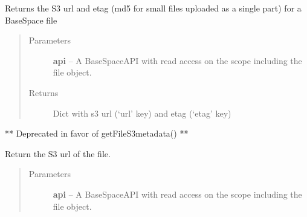 \documentclass[letterpaper,10pt,english]{sphinxmanual}
\begin{document}
\begin{fulllineitems}
\begin{fulllineitems}
\begin{quote}
\begin{description}
\end{description}\end{quote}

\end{fulllineitems}


\begin{fulllineitems}
\label{Available modules:BaseSpacePy.model.File.File.getFileS3metadata}
Returns the S3 url and etag (md5 for small files uploaded as a single part) for a BaseSpace file
\begin{quote}\begin{description}
\item[{Parameters}] \leavevmode
\textbf{api} -- A BaseSpaceAPI with read access on the scope including the file object.

\item[{Returns}] \leavevmode
Dict with s3 url (`url' key) and etag (`etag' key)

\end{description}\end{quote}

\end{fulllineitems}


\begin{fulllineitems}
\label{Available modules:BaseSpacePy.model.File.File.getFileUrl}
** Deprecated in favor of getFileS3metadata() **

Return the S3 url of the file.
\begin{quote}\begin{description}
\item[{Parameters}] \leavevmode
\textbf{api} -- A BaseSpaceAPI with read access on the scope including the file object.

\end{description}\end{quote}

\end{fulllineitems}



\end{fulllineitems}
\end{document}
